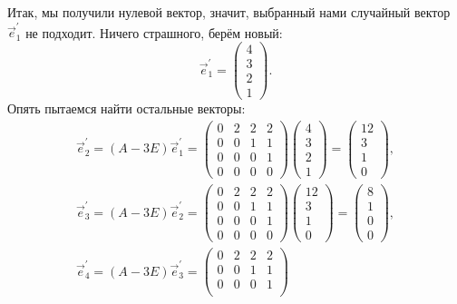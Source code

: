 \begin{solution}
	Итак, мы получили нулевой вектор, значит, выбранный нами случайный вектор $\vec{e}_1^\prime$ не подходит. Ничего страшного, берём новый:
	\[
		\vec{e}^\prime_1 =
		\begin{pmatrix}
			4\\
			3\\
			2\\
			1
		\end{pmatrix}.
	\]
	Опять пытаемся найти остальные векторы:
	\begin{gather*}
		\vec{e}^\prime_2 = (A - 3E)\vec{e}^\prime_1 = 
		\begin{pmatrix}
			0 & 2 & 2 & 2\\
			0 & 0 & 1 & 1\\
			0 & 0 & 0 & 1\\
			0 & 0 & 0 & 0
		\end{pmatrix}
		\begin{pmatrix}
			4\\
			3\\
			2\\
			1
		\end{pmatrix} =
		\begin{pmatrix}
			12\\
			3\\
			1\\
			0
		\end{pmatrix},\\
		\vec{e}^\prime_3 = (A - 3E)\vec{e}^\prime_2 = 
		\begin{pmatrix}
			0 & 2 & 2 & 2\\
			0 & 0 & 1 & 1\\
			0 & 0 & 0 & 1\\
			0 & 0 & 0 & 0
		\end{pmatrix}
		\begin{pmatrix}
			12\\
			3\\
			1\\
			0
		\end{pmatrix} =
		\begin{pmatrix}
			8\\
			1\\
			0\\
			0
		\end{pmatrix},\\
		\vec{e}^\prime_4 = (A - 3E)\vec{e}^\prime_3 = 
		\begin{pmatrix}
			0 & 2 & 2 & 2\\
			0 & 0 & 1 & 1\\
			0 & 0 & 0 & 1\\

\end{pmatrix}
\end{gather*}
\end{solution}
